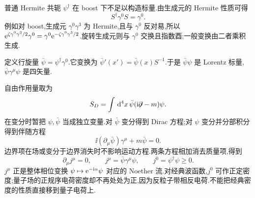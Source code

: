 普通 Hermite 共轭 $\psi^\dagger$ 在 boost 下不足以构造标量.由生成元的 Hermite 性质可得
\begin{equation}
 S^\dagger\gamma^0S=\gamma^0.
\end{equation}
例如对 boost,生成元 $\gamma^0\gamma^3$ 为 Hermite,且与 $\gamma^0$ 反对易,所以 $\mathrm e^{\zeta\gamma^0\gamma^3/2}\gamma^0=\gamma^0\mathrm e^{-\zeta\gamma^0\gamma^3/2}$.旋转生成元则与 $\gamma^0$ 交换且指数酉;一般变换由二者乘积生成.

\begin{definition}[Dirac 伴随]
定义行旋量 $\bar\psi=\psi^\dagger\gamma^0$.它变换为 $\bar\psi'(x')=\bar\psi(x)S^{-1}$.于是 $\bar\psi\psi$ 是 Lorentz 标量,$\bar\psi\gamma^\mu\psi$ 是四矢量.
\end{definition}

自由作用量取为
\begin{equation}
 S_D=\int\,\mathrm d^4x\,\bar\psi(\mathrm i\mathord{\not\mathrel{\partial}}-m)\psi.
\end{equation}
在变分时暂把 $\psi,\bar\psi$ 当成独立变量.对 $\bar\psi$ 变分得到 Dirac 方程;对 $\psi$ 变分并分部积分得到伴随方程
\begin{equation}
 \ii(\partial_\mu\bar\psi)\gamma^\mu+m\bar\psi=0.
\end{equation}
边界项在场或变分于边界消失时不影响运动方程.两条方程相加消去质量项,得到
\begin{equation}
 \partial_\mu j^\mu=0,
 \qquad j^\mu=\bar\psi\gamma^\mu\psi,
 \qquad j^0=\psi^\dagger\psi\geq0.
\end{equation}
$j^\mu$ 正是整体相位变换 $\psi\mapsto\mathrm e^{-\mathrm i\alpha}\psi$ 对应的 Noether 流.对经典波函数,$j^0$ 可作正定密度;量子场的正规序电荷密度却不再处处为正,因为反粒子带相反电荷.不能把经典密度的性质直接移到量子电荷上.


